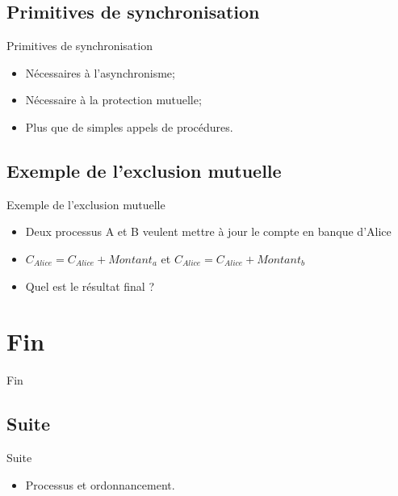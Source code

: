 \begin{frame}{\sectitle}
\def\subsectitle{Primitives de synchronisation}
\subsection{\subsectitle}

\begin{block}{\subsectitle}
\begin{itemize}
    \item Nécessaires à l'asynchronisme;
    \item Nécessaire à la protection mutuelle;
    \item Plus que de simples appels de procédures.
\end{itemize}
\end{block}

\def\subsectitle{Exemple de l'exclusion mutuelle}
\subsection{\subsectitle}

\begin{exampleblock}{\subsectitle}
\begin{itemize}
    \item Deux processus A et B veulent mettre à jour le compte en banque
    d'Alice
    \item $C_{Alice} = C_{Alice} + Montant_{a}$ et $C_{Alice} = C_{Alice} +
    Montant_{b}$
    \item Quel est le résultat final ?
\end{itemize}
\end{exampleblock}

\end{frame}

\def\sectitle{Fin}
\section{\sectitle}

\begin{frame}{\sectitle}
\def\subsectitle{Suite}
\subsection{\subsectitle}

\begin{exampleblock}{\subsectitle}
\begin{itemize}
    \item Processus et ordonnancement.
\end{itemize}
\end{exampleblock}

\end{frame}


